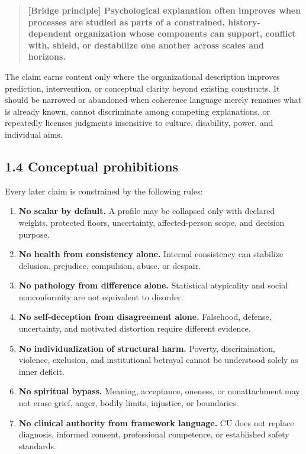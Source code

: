 \documentclass[
  11pt,
]{article}
\providecommand{\tightlist}{%
  \setlength{\itemsep}{0pt}\setlength{\parskip}{0pt}}
\begin{document}
\begin{quote}
\textbf{{[}Bridge principle{]} Psychological explanation often improves
when processes are studied as parts of a constrained, history-dependent
organization whose components can support, conflict with, shield, or
destabilize one another across scales and horizons.}
\end{quote}

The claim earns content only where the organizational description
improves prediction, intervention, or conceptual clarity beyond existing
constructs. It should be narrowed or abandoned when coherence language
merely renames what is already known, cannot discriminate among
competing explanations, or repeatedly licenses judgments insensitive to
culture, disability, power, and individual aims.

\subsection{1.4 Conceptual prohibitions}\label{conceptual-prohibitions}

Every later claim is constrained by the following rules:

\begin{enumerate}
\def\labelenumi{\arabic{enumi}.}
\tightlist
\item
  \textbf{No scalar by default.} A profile may be collapsed only with
  declared weights, protected floors, uncertainty, affected-person
  scope, and decision purpose.
\item
  \textbf{No health from consistency alone.} Internal consistency can
  stabilize delusion, prejudice, compulsion, abuse, or despair.
\item
  \textbf{No pathology from difference alone.} Statistical atypicality
  and social nonconformity are not equivalent to disorder.
\item
  \textbf{No self-deception from disagreement alone.} Falsehood,
  defense, uncertainty, and motivated distortion require different
  evidence.
\item
  \textbf{No individualization of structural harm.} Poverty,
  discrimination, violence, exclusion, and institutional betrayal cannot
  be understood solely as inner deficit.
\item
  \textbf{No spiritual bypass.} Meaning, acceptance, oneness, or
  nonattachment may not erase grief, anger, bodily limits, injustice, or
  boundaries.
\item
  \textbf{No clinical authority from framework language.} CU does not
  replace diagnosis, informed consent, professional competence, or
  established safety standards.
\end{enumerate}
\end{document}
